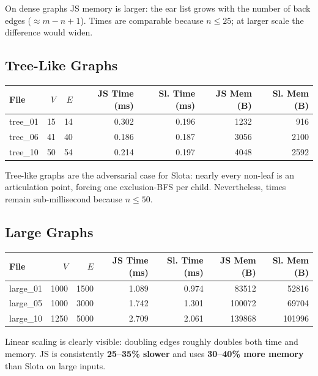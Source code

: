 \documentclass[12pt,a4paper]{article}
\begin{document}
On dense graphs JS memory is larger: the ear list grows with the number of
back edges ($\approx m - n + 1$).  Times are comparable because $n \leq 25$;
at larger scale the difference would widen.

\subsection{Tree-Like Graphs}

\begin{center}
\begin{tabular}{|l|r|r|r|r|r|r|}
\hline
File & $V$ & $E$ & JS Time (ms) & Sl. Time (ms) & JS Mem (B) & Sl. Mem (B) \\ \hline
tree\_01 & 15 & 14 & 0.302 & 0.196 & 1232 &  916 \\ \hline
tree\_06 & 41 & 40 & 0.186 & 0.187 & 3056 & 2100 \\ \hline
tree\_10 & 50 & 54 & 0.214 & 0.197 & 4048 & 2592 \\ \hline
\end{tabular}
\end{center}

Tree-like graphs are the adversarial case for Slota: nearly every
non-leaf is an articulation point, forcing one exclusion-BFS per child.
Nevertheless, times remain sub-millisecond because $n \leq 50$.

\subsection{Large Graphs}

\begin{center}
\begin{tabular}{|l|r|r|r|r|r|r|}
\hline
File & $V$ & $E$ & JS Time (ms) & Sl. Time (ms) & JS Mem (B) & Sl. Mem (B) \\ \hline
large\_01 & 1000 & 1500 & 1.089 & 0.974 &  83512 &  52816 \\ \hline
large\_05 & 1000 & 3000 & 1.742 & 1.301 & 100072 &  69704 \\ \hline
large\_10 & 1250 & 5000 & 2.709 & 2.061 & 139868 & 101996 \\ \hline
\end{tabular}
\end{center}

Linear scaling is clearly visible: doubling edges roughly doubles both
time and memory.  JS is consistently \textbf{25--35\% slower} and uses
\textbf{30--40\% more memory} than Slota on large inputs.
\end{document}

